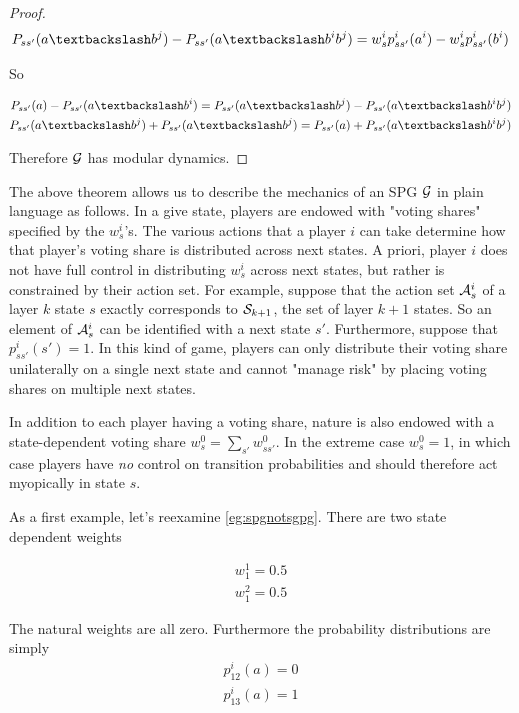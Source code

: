 \begin{thm}
\begin{proof}
$$
P_{ss'}(\asub{a}{b^j}) - P_{ss'}(\asub{a}{b^ib^j}) = w^{i}_{s}p^i_{ss'}(a^i) - w^{i}_{s}p^i_{ss'}(b^i)
$$

So

\begin{align*}
P_{ss'}(a) - P_{ss'}(\asub{a}{b^i}) = P_{ss'}(\asub{a}{b^j}) - P_{ss'}(\asub{a}{b^ib^j}) \\
P_{ss'}(\asub{a}{b^j}) + P_{ss'}(\asub{a}{b^j}) = P_{ss'}(a) + P_{ss'}(\asub{a}{b^ib^j})
\end{align*}

Therefore $\GG$ has modular dynamics.
\end{proof}

\label{thm:weightvote}
\end{thm}


The above theorem allows us to describe the mechanics of an SPG $\GG$ in plain language as follows. In a give state, players are endowed with "voting shares" specified by the $w^i_s$'s. The various actions that a player $i$ can take determine how that player's voting share is distributed across next states. A priori, player $i$ does not have full control in distributing $w^i_s$ across next states, but rather is constrained by their action set. For example, suppose that the action set $\AA^i_s$ of a layer $k$ state $s$ exactly corresponds to $\SS_{k+1}$, the set of layer $k+1$ states. So an element of $\AA^i_s$ can be identified with a next state $s'$. Furthermore, suppose that $p^i_{ss'}(s') = 1$. In this kind of game, players can only distribute their voting share unilaterally on a single next state and cannot "manage risk" by placing voting shares on multiple next states.


In addition to each player having a voting share, nature is also endowed with a state-dependent voting share $w^0_s = \sum_{s'} w^0_{ss'}$. In the extreme case $w^0_s = 1$, in which case players have {\em no} control on transition probabilities and should therefore act myopically in state $s$.

As a first example, let's reexamine \ref{eg:spgnotsgpg}. There are two state dependent weights

\begin{align*}
w^1_{1} = 0.5 \\
w^2_{1} = 0.5
\end{align*}

The natural weights are all zero. Furthermore the probability distributions are simply
\begin{align*}
p^i_{12}(a) = 0 \\
p^i_{13}(a) = 1
\end{align*}

